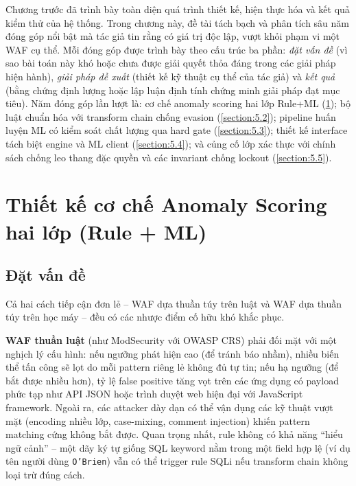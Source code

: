 \documentclass[../DoAn.tex]{subfiles}
\begin{document}
Chương trước đã trình bày toàn diện quá trình thiết kế, hiện thực hóa và
kết quả kiểm thử của hệ thống. Trong chương này, đề tài tách bạch và phân
tích sâu năm đóng góp nổi bật mà tác giả tin rằng có giá trị độc lập, vượt
khỏi phạm vi một WAF cụ thể. Mỗi đóng góp được trình bày theo cấu trúc ba
phần: \textit{đặt vấn đề} (vì sao bài toán này khó hoặc chưa được giải
quyết thỏa đáng trong các giải pháp hiện hành), \textit{giải pháp đề xuất}
(thiết kế kỹ thuật cụ thể của tác giả) và \textit{kết quả} (bằng chứng
định lượng hoặc lập luận định tính chứng minh giải pháp đạt mục tiêu).
Năm đóng góp lần lượt là: cơ chế anomaly scoring hai lớp Rule+ML
(\ref{section:5.1}); bộ luật chuẩn hóa với transform chain chống evasion
(\ref{section:5.2}); pipeline huấn luyện ML có kiểm soát chất lượng qua
hard gate (\ref{section:5.3}); thiết kế interface tách biệt engine và ML
client (\ref{section:5.4}); và củng cố lớp xác thực với chính sách
chống leo thang đặc quyền và các invariant chống lockout
(\ref{section:5.5}).

\section{Thiết kế cơ chế Anomaly Scoring hai lớp (Rule + ML)}
\label{section:5.1}

\subsection{Đặt vấn đề}
\label{subsection:5.1.1}

Cả hai cách tiếp cận đơn lẻ -- WAF dựa thuần túy trên luật và WAF dựa
thuần túy trên học máy -- đều có các nhược điểm cố hữu khó khắc phục.

\textbf{WAF thuần luật} (như ModSecurity với OWASP CRS) phải đối mặt với
một nghịch lý cấu hình: nếu ngưỡng phát hiện cao (để tránh báo nhầm), nhiều
biến thể tấn công sẽ lọt do mỗi pattern riêng lẻ không đủ tự tin; nếu hạ
ngưỡng (để bắt được nhiều hơn), tỷ lệ false positive tăng vọt trên các
ứng dụng có payload phức tạp như API JSON hoặc trình duyệt web hiện đại
với JavaScript framework. Ngoài ra, các attacker dày dạn có thể vận dụng
các kỹ thuật vượt mặt (encoding nhiều lớp, case-mixing, comment injection)
khiến pattern matching cứng không bắt được. Quan trọng nhất, rule không
có khả năng ``hiểu ngữ cảnh'' -- một dãy ký tự giống SQL keyword nằm trong
một field hợp lệ (ví dụ tên người dùng \texttt{O'Brien}) vẫn có thể trigger
rule SQLi nếu transform chain không loại trừ đúng cách.
\end{document}

